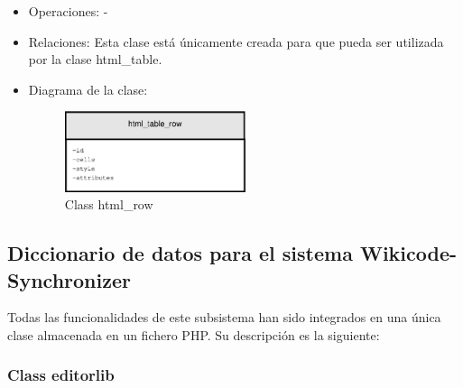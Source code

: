 \begin{itemize}
\begin{itemize}
		\end{itemize}
	\item Operaciones: -
	\item Relaciones: Esta clase está únicamente creada para que pueda ser utilizada por la clase html\_table.
	\item Diagrama de la clase:
		\begin{figure}[h]
			\centering
			\includegraphics[width=0.5\textwidth]{./img/html_table_row.eps}
			\caption{Class html\_row}
		\end{figure}
\end{itemize}

\subsection{Diccionario de datos para el sistema Wikicode-Synchronizer}

Todas las funcionalidades de este subsistema han sido integrados en una única clase almacenada en un fichero PHP. Su descripción es la siguiente:

\subsubsection{Class editorlib}

